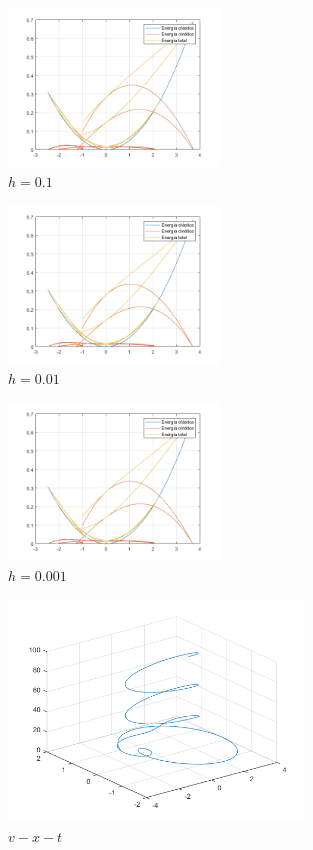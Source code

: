\documentclass{article}
\begin{document}
\newpage
\clearpage

\begin{figure}[H]
\centering
    \includegraphics[width=0.5\textwidth]{images/003B1.png}
    \caption{$h=0.1$}
\end{figure}

\begin{figure}[H]
\centering
    \includegraphics[width=0.5\textwidth]{images/003B2.png}
    \caption{$h=0.01$}
\end{figure}

\begin{figure}[H]
\centering
    \includegraphics[width=0.5\textwidth]{images/003B3.png}
    \caption{$h=0.001$}
\end{figure}

\clearpage
\newpage

\begin{figure}[H]
\centering
    \includegraphics[width=0.7\textwidth]{images/003C.png}
    \caption{$v-x-t$}
\end{figure}
\end{document}
